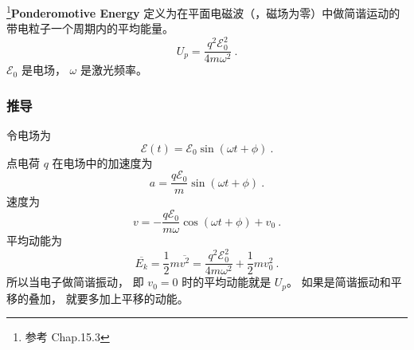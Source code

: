 

\footnote{参考 \cite{Bransden} Chap.15.3}\textbf{Ponderomotive Energy} 定义为在平面电磁波（，磁场为零）中做简谐运动的带电粒子一个周期内的平均能量。
\begin{equation}\label{eq_Ponder_1}
U_p = \frac{q^2 \mathcal E_0^2}{4m\omega^2}~.
\end{equation}
$\mathcal E_0$ 是电场， $\omega$ 是激光频率。

\subsubsection{推导}
令电场为
\begin{equation}
\mathcal E(t) = \mathcal E_0 \sin(\omega t + \phi)~.
\end{equation}
点电荷 $q$ 在电场中的加速度为
\begin{equation}
a = \frac{q\mathcal E_0}{m} \sin(\omega t + \phi)~.
\end{equation}
速度为
\begin{equation}
v = -\frac{q\mathcal E_0}{m\omega} \cos(\omega t + \phi) + v_0~.
\end{equation}
平均动能为
\begin{equation}
\overline{E_k} = \frac{1}{2}m \overline{v^2} = \frac{q^2\mathcal E_0^2}{4m\omega^2} + \frac{1}{2}mv_0^2~.
\end{equation}
所以当电子做简谐振动， 即 $v_0 = 0$ 时的平均动能就是 $U_p$。 如果是简谐振动和平移的叠加， 就要多加上平移的动能。
